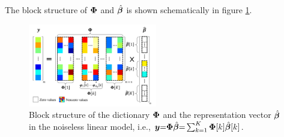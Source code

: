 The block structure of $\boldsymbol{\Phi}$ and $\hat{\boldsymbol{\beta}}$ is shown schematically in figure \ref{fig:Model}.
\begin{figure}[!b]
\centering
\includegraphics[width=0.5\textwidth,keepaspectratio]{images/Model.png} %
\centering
\caption{Block structure of the dictionary $\boldsymbol{\Phi}$ and the representation vector $\hat{\boldsymbol{\beta}}$ in the noiseless linear model, i.e., $\boldsymbol{y} {=} \boldsymbol{\Phi} \hat{\boldsymbol{\beta}} {=} \sum_{k=1}^{K} \boldsymbol{\Phi}[k] \hat{\boldsymbol{\beta}} [k]$.}
\label{fig:Model}
\end{figure}